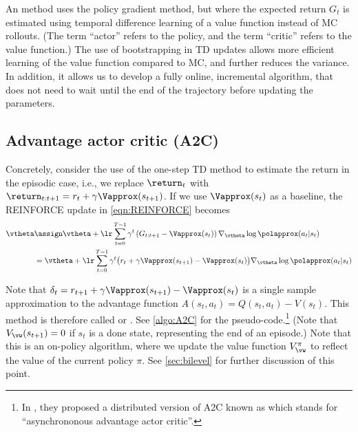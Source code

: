 An  method \citep{Barto1983}
uses the policy gradient method,
but where the expected return $G_t$ is estimated
using temporal difference learning
of a value function instead of MC rollouts.
(The term ``actor'' refers to the policy,
and the term ``critic'' refers to the value function.)
The use of bootstrapping in TD updates
allows more efficient learning of the value function
compared to MC, and further reduces the variance.
In addition, it allows us to develop a fully online, incremental
algorithm, that does not need to wait until the end of the trajectory
before updating the parameters.


\subsection{Advantage actor critic (A2C)}
\label{sec:A2C}
\label{sec:A3C}

Concretely, consider the use of the one-step TD method
to estimate the return in the episodic case,
i.e., we replace $\return_t$ with
$\return_{t:t+1}=r_t+ \gamma \Vapprox(s_{t+1})$.
If we use $\Vapprox(s_t)$ as a baseline,
the REINFORCE update in \cref{eqn:REINFORCE} becomes
\begin{align}
\vtheta 
&\assign \vtheta + \lr \sum_{t=0}^{T-1} \gamma^t \left(G_{t:t+1} - \Vapprox(s_t)\right) \nabla_{\vtheta} \log\polapprox(a_t|s_t) \\
&= \vtheta + \lr \sum_{t=0}^{T-1} \gamma^t \big(r_t+ \gamma \Vapprox(s_{t+1}) - \Vapprox(s_t)\big) \nabla_{\vtheta} \log\polapprox(a_t|s_t)
\end{align}




Note that
$\delta_t = r_{t+1} + \gamma \Vapprox(s_{t+1}) -\Vapprox(s_t)$
is a single sample approximation
to the advantage function $A(s_t,a_t) = Q(s_t,a_t) - V(s_t)$.
This method is therefore called 
 or .
See \cref{algo:A2C} for the pseudo-code.\footnote{
%
In \citep{A3C}, they proposed
a distributed version of A2C known as
which stands for  ``asynchrononous advantage actor critic''. 
}
(Note that $V_{\vw}(s_{t+1})=0$ if $s_t$ is a done state,
representing the end of an episode.)
Note that this is an on-policy algorithm,
where we update the value function $V_{\vw}^{\pi}$
to reflect the value of the current policy $\pi$.
See \cref{sec:bilevel} for further discussion of this point.

